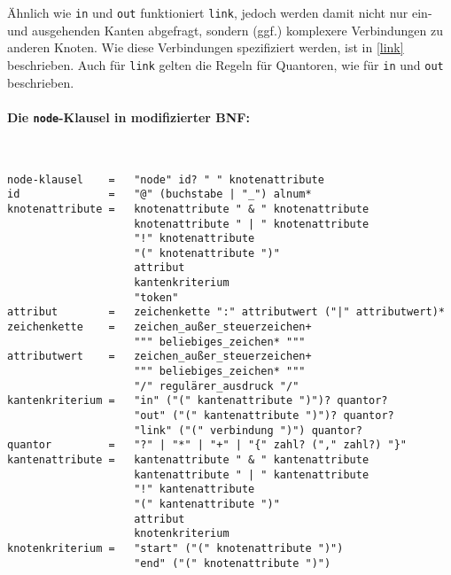 \documentclass[12pt]{scrartcl}
\begin{document}
Ähnlich wie \texttt{in} und \texttt{out} funktioniert \texttt{link}, jedoch werden damit nicht nur ein- und ausgehenden Kanten abgefragt, sondern (ggf.) komplexere Verbindungen zu anderen Knoten. Wie diese Verbindungen spezifiziert werden, ist in \ref{link} beschrieben. Auch für \texttt{link} gelten die Regeln für Quantoren, wie für \texttt{in} und \texttt{out} beschrieben.

\paragraph*{Die \texttt{node}-Klausel in modifizierter BNF:}
~
\begin{framed}
\begin{lstlisting}
node-klausel    =   "node" id? " " knotenattribute
id              =   "@" (buchstabe | "_") alnum*
knotenattribute =   knotenattribute " & " knotenattribute
                    knotenattribute " | " knotenattribute
                    "!" knotenattribute
                    "(" knotenattribute ")"
                    attribut
                    kantenkriterium
                    "token"
attribut        =   zeichenkette ":" attributwert ("|" attributwert)*
zeichenkette    =   zeichen_außer_steuerzeichen+
                    """ beliebiges_zeichen* """
attributwert    =   zeichen_außer_steuerzeichen+
                    """ beliebiges_zeichen* """
                    "/" regulärer_ausdruck "/"
kantenkriterium =   "in" ("(" kantenattribute ")")? quantor?
                    "out" ("(" kantenattribute ")")? quantor?
                    "link" ("(" verbindung ")") quantor?
quantor         =   "?" | "*" | "+" | "{" zahl? ("," zahl?) "}"
kantenattribute =   kantenattribute " & " kantenattribute
                    kantenattribute " | " kantenattribute
                    "!" kantenattribute
                    "(" kantenattribute ")"
                    attribut
                    knotenkriterium
knotenkriterium =   "start" ("(" knotenattribute ")")
                    "end" ("(" knotenattribute ")")
\end{lstlisting}
\end{framed}
\end{document}
